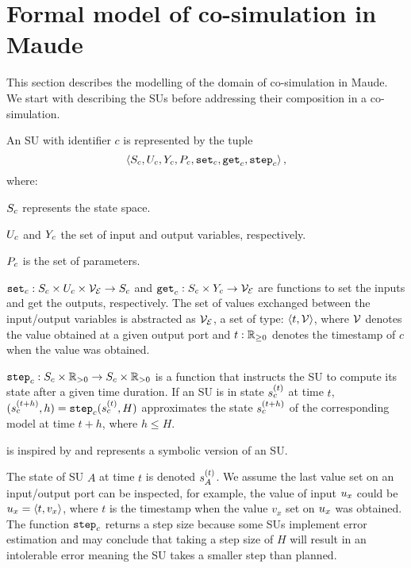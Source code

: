\section{Formal model of co-simulation in Maude}
This section describes the modelling of the domain of co-simulation in Maude. We start with describing the SUs before addressing their composition in a co-simulation.

\begin{definition}\label{def:fmu}
  An SU with identifier $c$ is represented by the tuple
  $$ \left\langle S_{c}, U_{c}, Y_{c}, P_{c}, \mathtt{set}_{c}, \mathtt{get}_{c}, \mathtt{step}_{c} \right\rangle ,$$
  where:
  \begin{compactitem}
    \item $S_{c}$ represents the state space.
    \item $U_{c}$ and $Y_{c}$ the set of input and output variables, respectively. 
    \item $P_{c}$ is the set of parameters.
    \item $\mathtt{set}_{c} : S_{c} \times U_{c} \times \mathcal{V_{E}} \to S_{c}$ and $\mathtt{get}_{c}: S_{c} \times Y_{c} \to \mathcal{V_{E}}$ are functions to set the inputs and get the outputs, respectively. The set of values exchanged between the input/output variables is abstracted as $\mathcal{V_{E}}$, a set of type: $ \left\langle t, \mathcal{V} \right\rangle $, where $\mathcal{V}$ denotes the value obtained at a given output port and $t: \mathbb{R}_{\geq 0}$ denotes the timestamp of $c$ when the value was obtained.
    \item $\mathtt{step}_{c}: S_{c} \times \mathbb{R}_{> 0} \to S_{c} \times \mathbb{R}_{> 0} $ is a function that instructs the SU to compute its state after a given time duration. If an SU is in state $s_{c}^{(t)}$ at time $t$, $(s_{c}^{(t+h)}, h) = \mathtt{step}_{c}(s_{c}^{(t)}, H)$ approximates the state $s_{c}^{(t+h)}$ of the corresponding model at time $t+h$, where $h \leq H$. 
  \end{compactitem}
\end{definition}

 is inspired by \cite{Broman2013,Gomes2019c,thrane2021} and represents a symbolic version of an SU. 

The state of SU $A$ at time $t$ is denoted $s_{A}^{(t)}$.
We assume the last value set on an input/output port can be inspected, for example, the value of input $u_{x}$ could be $u_{x} =  \left\langle t, v_x \right\rangle $, where $t$ is the timestamp when the value $v_x$ set on $u_{x}$ was obtained.
The function $\mathtt{step}_{c}$ returns a step size because some SUs implement error estimation and may conclude that taking a step size of $H$ will result in an intolerable error meaning the SU takes a smaller step than planned.

